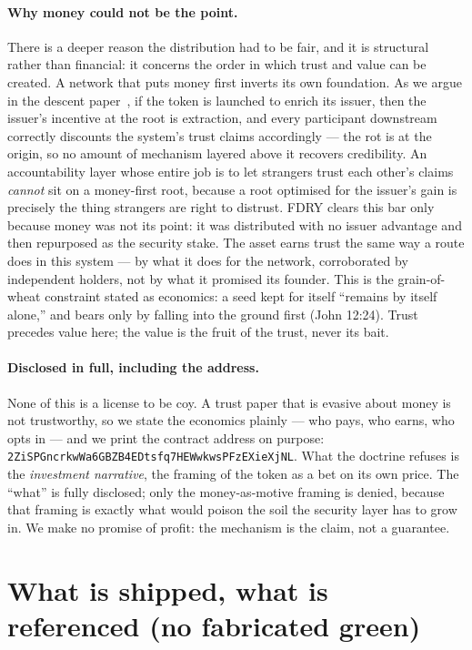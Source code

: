 \documentclass[11pt]{article}
\newcommand{\CA}{\texttt{2ZiSPGncrkwWa6GBZB4EDtsfq7HEWwkwsPFzEXieXjNL}}
\begin{document}
\paragraph{Why money could not be the point.} There is a deeper reason the
distribution had to be fair, and it is structural rather than financial: it concerns
the order in which trust and value can be created. A network that puts money first
inverts its own foundation. As we argue in the descent paper~\cite{internalapis},
if the token is launched to enrich its issuer, then the issuer's incentive at the
root is extraction, and every participant downstream correctly discounts the
system's trust claims accordingly --- the rot is at the origin, so no amount of
mechanism layered above it recovers credibility. An accountability layer whose
entire job is to let strangers trust each other's claims \emph{cannot} sit on a
money-first root, because a root optimised for the issuer's gain is precisely the
thing strangers are right to distrust. FDRY clears this bar only because money was
not its point: it was distributed with no issuer advantage and then repurposed as
the security stake. The asset earns trust the same way a route does in this system
--- by what it does for the network, corroborated by independent holders, not by
what it promised its founder. This is the grain-of-wheat constraint stated as
economics: a seed kept for itself ``remains by itself alone,'' and bears only by
falling into the ground first (John 12:24). Trust precedes value here; the value is
the fruit of the trust, never its bait.

\paragraph{Disclosed in full, including the address.} None of this is a license to
be coy. A trust paper that is evasive about money is not trustworthy, so we state
the economics plainly --- who pays, who earns, who opts in --- and we print the
contract address on purpose: \CA{}. What the doctrine refuses is the
\emph{investment narrative}, the framing of the token as a bet on its own price.
The ``what'' is fully disclosed; only the money-as-motive framing is denied,
because that framing is exactly what would poison the soil the security layer has to
grow in. We make no promise of profit: the mechanism is the claim, not a guarantee.

\section{What is shipped, what is referenced (no fabricated green)}
\end{document}
